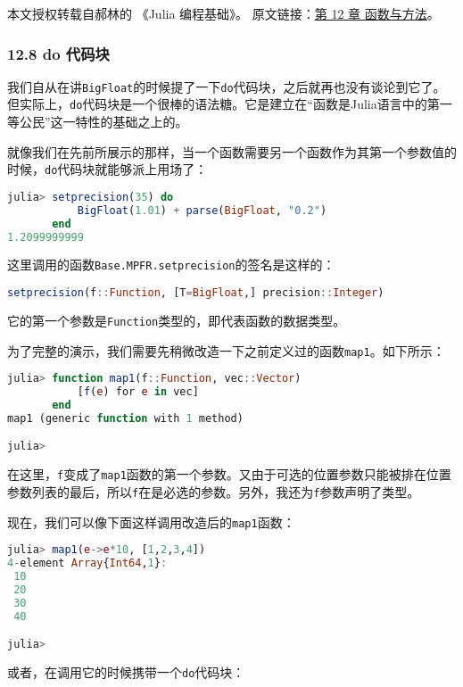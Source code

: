 
本文授权转载自郝林的 《Julia 编程基础》。 原文链接：\href{https://github.com/hyper0x/JuliaBasics/blob/master/book/ch12.md}{第 12 章 函数与方法}。


\subsubsection{12.8 do 代码块}

我们自从在讲\verb`BigFloat`的时候提了一下\verb`do`代码块，之后就再也没有谈论到它了。但实际上，\verb`do`代码块是一个很棒的语法糖。它是建立在“函数是Julia语言中的第一等公民”这一特性的基础之上的。

就像我们在先前所展示的那样，当一个函数需要另一个函数作为其第一个参数值的时候，\verb`do`代码块就能够派上用场了：

\begin{lstlisting}[language=julia]
julia> setprecision(35) do 
           BigFloat(1.01) + parse(BigFloat, "0.2") 
       end
1.2099999999
\end{lstlisting}

这里调用的函数\verb`Base.MPFR.setprecision`的签名是这样的：

\begin{lstlisting}[language=julia]
setprecision(f::Function, [T=BigFloat,] precision::Integer)
\end{lstlisting}

它的第一个参数是\verb`Function`类型的，即代表函数的数据类型。

为了完整的演示，我们需要先稍微改造一下之前定义过的函数\verb`map1`。如下所示：

\begin{lstlisting}[language=julia]
julia> function map1(f::Function, vec::Vector)
           [f(e) for e in vec]
       end
map1 (generic function with 1 method)

julia> 
\end{lstlisting}

在这里，\verb`f`变成了\verb`map1`函数的第一个参数。又由于可选的位置参数只能被排在位置参数列表的最后，所以\verb`f`在是必选的参数。另外，我还为\verb`f`参数声明了类型。

现在，我们可以像下面这样调用改造后的\verb`map1`函数：

\begin{lstlisting}[language=julia]
julia> map1(e->e*10, [1,2,3,4])
4-element Array{Int64,1}:
 10
 20
 30
 40

julia> 
\end{lstlisting}
或者，在调用它的时候携带一个\verb`do`代码块：

